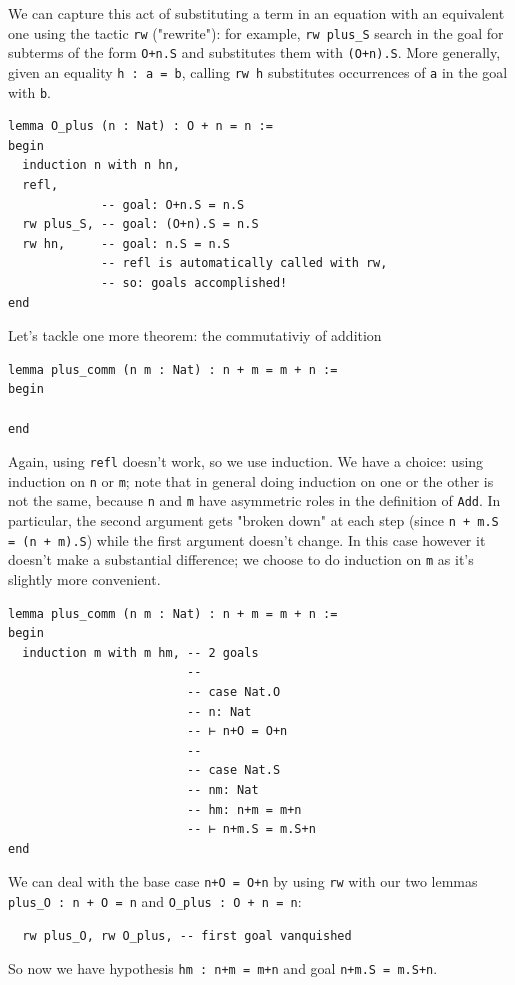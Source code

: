 \documentclass[oneside]{book}
\theoremstyle{definition}
\theoremstyle{remark}
\theoremstyle{plain}
\begin{document}
We can capture this act of substituting a term in an equation with an equivalent one using the tactic \lstinline{rw} ("rewrite"):
for example, \lstinline{rw plus_S} search in the goal for subterms of the form \lstinline{O+n.S} and substitutes them with \lstinline{(O+n).S}.
More generally, given an equality \lstinline{h : a = b}, calling \lstinline{rw h} substitutes occurrences of \lstinline{a} in the goal with \lstinline{b}.
\begin{lstlisting}
lemma O_plus (n : Nat) : O + n = n :=
begin
  induction n with n hn,
  refl,
             -- goal: O+n.S = n.S
  rw plus_S, -- goal: (O+n).S = n.S
  rw hn,     -- goal: n.S = n.S
             -- refl is automatically called with rw,
             -- so: goals accomplished!
end
\end{lstlisting}
Let's tackle one more theorem: the commutativiy of addition
\begin{lstlisting}
lemma plus_comm (n m : Nat) : n + m = m + n :=
begin

end
\end{lstlisting}
Again, using \lstinline{refl} doesn't work, so we use induction.
We have a choice: using induction on \lstinline{n} or \lstinline{m};
note that in general doing induction on one or the other is not the same,
because \lstinline{n} and \lstinline{m} have asymmetric roles in the definition of \lstinline{Add}.
In particular, the second argument gets "broken down" at each step
(since \lstinline{n + m.S = (n + m).S}) while the first argument doesn't change.
In this case however it doesn't make a substantial difference;
we choose to do induction on \lstinline{m} as it's slightly more convenient.
\begin{lstlisting}
lemma plus_comm (n m : Nat) : n + m = m + n :=
begin
  induction m with m hm, -- 2 goals
                         -- 
                         -- case Nat.O
                         -- n: Nat
                         -- ⊢ n+O = O+n
                         --
                         -- case Nat.S
                         -- nm: Nat
                         -- hm: n+m = m+n
                         -- ⊢ n+m.S = m.S+n
end
\end{lstlisting}
We can deal with the base case \lstinline{n+O = O+n} by using \lstinline{rw} with our two lemmas
\lstinline{plus_O : n + O = n} and \lstinline{O_plus : O + n = n}:
\begin{lstlisting}
  rw plus_O, rw O_plus, -- first goal vanquished
\end{lstlisting}
So now we have hypothesis \lstinline{hm : n+m = m+n} and goal \lstinline{n+m.S = m.S+n}.
\end{document}
